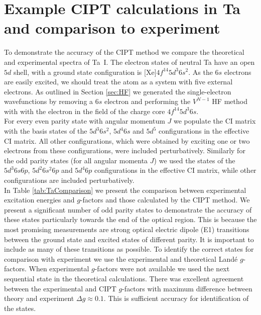 \documentclass[10pt,a4paper, twoside, openright]{report}
\begin{document}
\section{Example CIPT calculations in Ta and comparison to experiment} \label{sec:TaCIPT}
To demonstrate the accuracy of the CIPT method we compare the theoretical and experimental spectra of Ta~I. The electron states of neutral Ta have an open $5d$ shell, with a  ground state configuration is [Xe]$4f^{14}5d^3 6s^2$. As the $6s$ electrons are easily excited, we should treat the atom as a system with five external electrons. As outlined in Section \ref{sec:HF} we generated the single-electron wavefunctions by removing a $6s$ electron and performing the $V^{N-1}$ HF method with with the electron in the field of the charge core $4f^{14}5d^3 6s$.\\
\linebreak
For every even parity state with angular momentum $J$ we populate the CI matrix with the basis states of the $5d^3 6s^2$, $5d^4 6s$ and $5d^5$  configurations in the effective CI matrix. All other configurations, which were obtained by exciting one or two electrons from these configurations, were included perturbatively. Similarly for the odd parity states (for all angular momenta $J$) we used the states of the $5d^3 6s 6p$, $5d^2 6s^2 6p$ and $5d^4 6p$ configurations in the effective CI matrix, while other configurations are included perturbatively.\\
\linebreak
In Table \ref{tab:TaComparison} we present the comparison between experimental excitation energies and $g$-factors and those calculated by the CIPT method.  We present a significant number of odd parity states to demonstrate the accuracy of these states particularly towards the end of the optical region. This is because the most promising measurements are strong optical electric dipole (E1) transitions between the ground state and excited states of different parity. 
It is important to include as many of these transitions as possible. To identify the correct states for comparison with experiment 
we use the experimental and theoretical Land\'{e} $g$-factors. When experimental $g$-factors were not available we used the next sequential state in the theoretical calculations. There was excellent agreement between the experimental and CIPT $g$-factors with maximum difference between theory and experiment $\Delta g \approx 0.1$. This is sufficient accuracy for identification of the states.\\
\end{document}
